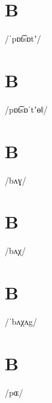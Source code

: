 \documentclass[10pt,a4paper,twoside]{book}
\begin{document}
\section*{B}

\begin{multicols}{3}
 {/ˈpɒt͡sɒtʼ/} {}
\end{multicols}

\section*{B}

\begin{multicols}{3}
 {/pɒt͡sɒˈtʼɵǁ/} {}
\end{multicols}

\section*{B}

\begin{multicols}{3}
 {/bʌɣ/} {}
\end{multicols}

\section*{B}

\begin{multicols}{3}
 {/bʌχ/} {}
\end{multicols}

\section*{B}

\begin{multicols}{3}
 {/ˈbʌχʌg/} {}
\end{multicols}

\section*{B}

\begin{multicols}{3}
 {/pɶ/} {}
\end{multicols}
\end{document}
